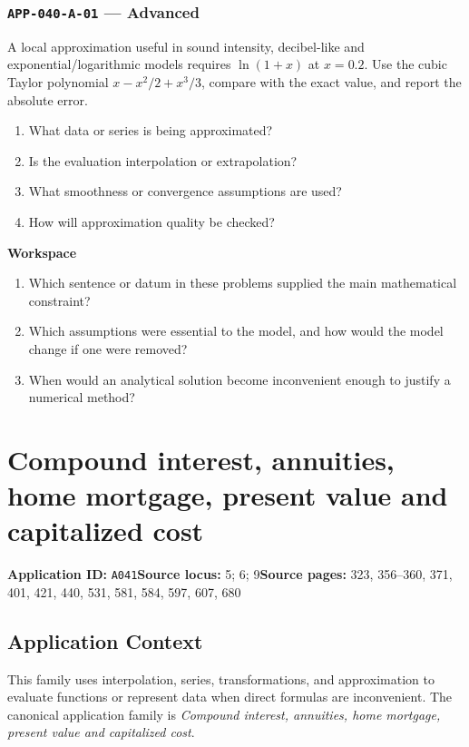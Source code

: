 \documentclass[11pt]{book}
\newcommand{\pid}[1]{\texttt{#1}}
\newcommand{\workspace}{\par\vspace{0.7in}\hrulefill\par\vspace{0.55in}\hrulefill\par}
\begin{document}
\subsection*{\pid{APP-040-A-01} — Advanced}
\begin{problembox}
A local approximation useful in sound intensity, decibel-like and exponential/logarithmic models requires $\ln(1+x)$ at $x=0.2$. Use the cubic Taylor polynomial $x-x^2/2+x^3/3$, compare with the exact value, and report the absolute error.
\end{problembox}
\begin{promptbox}\begin{enumerate}
\item What data or series is being approximated?
\item Is the evaluation interpolation or extrapolation?
\item What smoothness or convergence assumptions are used?
\item How will approximation quality be checked?
\end{enumerate}\end{promptbox}
\textbf{Workspace}\workspace
\begin{reflectionbox}\begin{enumerate}
\item Which sentence or datum in these problems supplied the main mathematical constraint?
\item Which assumptions were essential to the model, and how would the model change if one were removed?
\item When would an analytical solution become inconvenient enough to justify a numerical method?
\end{enumerate}\end{reflectionbox}
\chapter{Compound interest, annuities, home mortgage, present value and capitalized cost}\label{app:A041}
\textbf{Application ID:} \pid{A041}\quad \textbf{Source locus:} 5; 6; 9\quad \textbf{Source pages:} 323, 356–360, 371, 401, 421, 440, 531, 581, 584, 597, 607, 680
\section*{Application Context}
This family uses interpolation, series, transformations, and approximation to evaluate functions or represent data when direct formulas are inconvenient. The canonical application family is \emph{Compound interest, annuities, home mortgage, present value and capitalized cost}.
\end{document}

